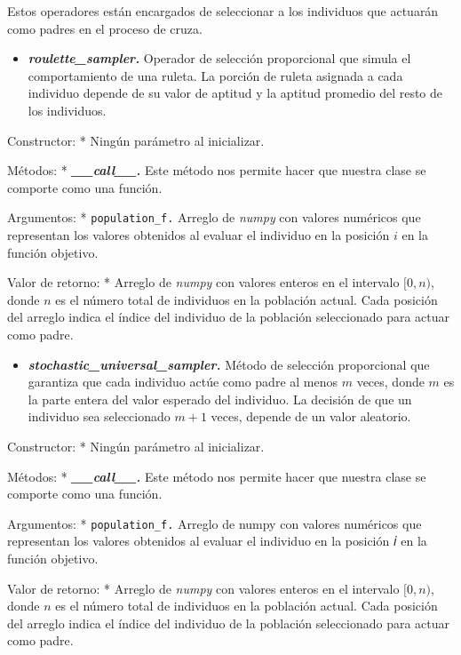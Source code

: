 \documentclass[11pt]{article}
\providecommand{\tightlist}{%
      \setlength{\itemsep}{0pt}\setlength{\parskip}{0pt}}
\begin{document}
Estos operadores están encargados de seleccionar a los individuos que
actuarán como padres en el proceso de cruza.

    \begin{itemize}
\tightlist
\item
  \emph{\textbf{roulette\_sampler.}} Operador de selección proporcional
  que simula el comportamiento de una ruleta. La porción de ruleta
  asignada a cada individuo depende de su valor de aptitud y la aptitud
  promedio del resto de los individuos.
\end{itemize}

Constructor: * Ningún parámetro al inicializar.

Métodos: * \emph{\textbf{\_\_call\_\_.}} Este método nos permite hacer
que nuestra clase se comporte como una función.

Argumentos: * \texttt{population\_f.} Arreglo de \emph{numpy} con
valores numéricos que representan los valores obtenidos al evaluar el
individuo en la posición \(i\) en la función objetivo.

Valor de retorno: * Arreglo de \emph{numpy} con valores enteros en el
intervalo \([0,n)\), donde \(n\) es el número total de individuos en la
población actual. Cada posición del arreglo indica el índice del
individuo de la población seleccionado para actuar como padre.

    \begin{itemize}
\tightlist
\item
  \emph{\textbf{stochastic\_universal\_sampler.}} Método de selección
  proporcional que garantiza que cada individuo actúe como padre al
  menos \(m\) veces, donde \(m\) es la parte entera del valor esperado
  del individuo. La decisión de que un individuo sea seleccionado
  \(m+1\) veces, depende de un valor aleatorio.
\end{itemize}

Constructor: * Ningún parámetro al inicializar.

Métodos: * \emph{\textbf{\_\_call\_\_.}} Este método nos permite hacer
que nuestra clase se comporte como una función.

Argumentos: * \texttt{population\_f.} Arreglo de numpy con valores
numéricos que representan los valores obtenidos al evaluar el individuo
en la posición 𝑖 en la función objetivo.

Valor de retorno: * Arreglo de \emph{numpy} con valores enteros en el
intervalo \([0,n)\), donde \(n\) es el número total de individuos en la
población actual. Cada posición del arreglo indica el índice del
individuo de la población seleccionado para actuar como padre.
\end{document}
